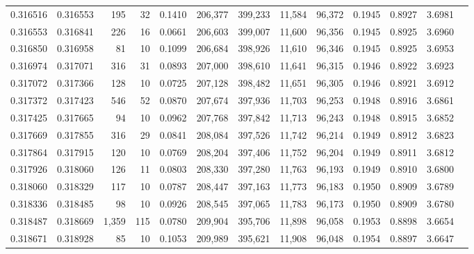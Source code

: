 \begin{tabular}{rrrrrrrrrrrrr}
0.316516 & 0.316553 &   195 &  32 &                                     0.1410 & 206,377 & 399,233 &  11,584 &  96,372 & 0.1945 & 0.8927 & 3.6981 \\
0.316553 & 0.316841 &   226 &  16 &                                     0.0661 & 206,603 & 399,007 &  11,600 &  96,356 & 0.1945 & 0.8925 & 3.6960 \\
0.316850 & 0.316958 &    81 &  10 &                                     0.1099 & 206,684 & 398,926 &  11,610 &  96,346 & 0.1945 & 0.8925 & 3.6953 \\
0.316974 & 0.317071 &   316 &  31 &                                     0.0893 & 207,000 & 398,610 &  11,641 &  96,315 & 0.1946 & 0.8922 & 3.6923 \\
0.317072 & 0.317366 &   128 &  10 &                                     0.0725 & 207,128 & 398,482 &  11,651 &  96,305 & 0.1946 & 0.8921 & 3.6912 \\
0.317372 & 0.317423 &   546 &  52 &                                     0.0870 & 207,674 & 397,936 &  11,703 &  96,253 & 0.1948 & 0.8916 & 3.6861 \\
0.317425 & 0.317665 &    94 &  10 &                                     0.0962 & 207,768 & 397,842 &  11,713 &  96,243 & 0.1948 & 0.8915 & 3.6852 \\
0.317669 & 0.317855 &   316 &  29 &                                     0.0841 & 208,084 & 397,526 &  11,742 &  96,214 & 0.1949 & 0.8912 & 3.6823 \\
0.317864 & 0.317915 &   120 &  10 &                                     0.0769 & 208,204 & 397,406 &  11,752 &  96,204 & 0.1949 & 0.8911 & 3.6812 \\
0.317926 & 0.318060 &   126 &  11 &                                     0.0803 & 208,330 & 397,280 &  11,763 &  96,193 & 0.1949 & 0.8910 & 3.6800 \\
0.318060 & 0.318329 &   117 &  10 &                                     0.0787 & 208,447 & 397,163 &  11,773 &  96,183 & 0.1950 & 0.8909 & 3.6789 \\
0.318336 & 0.318485 &    98 &  10 &                                     0.0926 & 208,545 & 397,065 &  11,783 &  96,173 & 0.1950 & 0.8909 & 3.6780 \\
0.318487 & 0.318669 & 1,359 & 115 &                                     0.0780 & 209,904 & 395,706 &  11,898 &  96,058 & 0.1953 & 0.8898 & 3.6654 \\
0.318671 & 0.318928 &    85 &  10 &                                     0.1053 & 209,989 & 395,621 &  11,908 &  96,048 & 0.1954 & 0.8897 & 3.6647 \\

\end{tabular}
